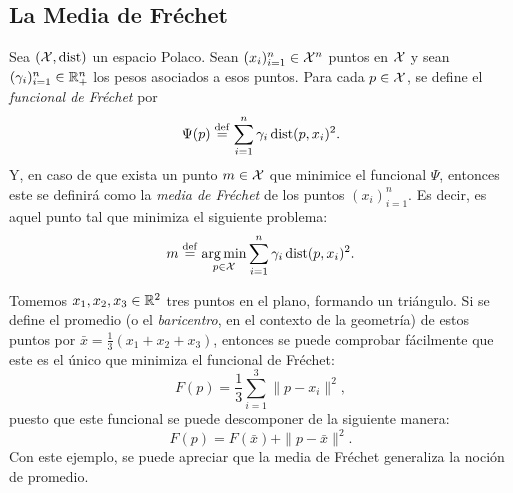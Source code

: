 {{		\subsection*{La Media de Fréchet}\label{ssec:la-media-de-Frechet}
		{
			\begin{definition}
				Sea $(\mathcal{X}, \operatorname{dist})$ un espacio Polaco. Sean $(x_{i})_{i=1}^{n}\in\mathcal{X}^n$ puntos en $\mathcal{X}$ y sean $(\gamma_{i})_{i=1}^{n}\in\mathbb{R}_+^n$ los pesos asociados a esos puntos. Para cada $p\in\mathcal{X}$, se define el \emph{funcional de Fréchet} por
				\begin{equation}
					\label{eq:funcionalFrechet}
					\Psi(p) \stackrel{\mathrm{def}}{=} \sum_{i=1}^{n} \gamma_i \operatorname{dist}(p, x_i)^2.
				\end{equation}
				Y, en caso de que exista un punto $m \in \mathcal{X}$ que minimice el funcional $\Psi$, entonces este se definirá como la \emph{media de Fréchet} de los puntos $(x_{i})_{i=1}^{n}$. Es decir, es aquel punto tal que minimiza el siguiente problema:
				\begin{equation}
					\label{eq:mediaFrechet}
					m \stackrel{\mathrm{def}}{=} \operatorname*{arg\,m{i}n}_{p \in \mathcal{X}} \sum_{i=1}^{n} \gamma_i \operatorname{dist}(p, x_i)^2.
				\end{equation}
			\end{definition}

			\begin{example}\label{ex:baricentro-triangulo}
				Tomemos $x_1, x_2, x_3 \in \mathbb{R}^2$ tres puntos en el plano, formando un triángulo. Si se define el promedio (o el \textit{baricentro}, en el contexto de la geometría) de estos puntos por $\bar x = \frac{1}{3} (x_1 + x_2 + x_3)$, entonces se puede comprobar fácilmente que este es el único que minimiza el funcional de Fréchet:
				\begin{equation}
					F(p) = \frac{1}{3} \sum_{i=1}^{3} \|p - x_i\|^2,
				\end{equation}
				puesto que este funcional se puede descomponer de la siguiente manera:
				\begin{equation}
					F(p) = F(\bar x) + \|p-\bar x\|^2.
				\end{equation}
				Con este ejemplo, se puede apreciar que la media de Fréchet generaliza la noción de promedio.
			\end{example}

}}}
